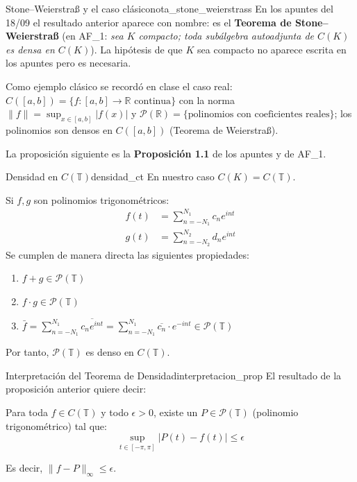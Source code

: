\begin{nota}{Stone--Weierstraß y el caso clásico}{nota_stone_weierstrass}
En los apuntes del 18/09 el resultado anterior aparece con nombre: es el \textbf{Teorema de Stone--Weierstraß} (en AF\_1: \emph{sea $K$ compacto; toda subálgebra autoadjunta de $C(K)$ es densa en $C(K)$}). La hipótesis de que $K$ sea compacto no aparece escrita en los apuntes pero es necesaria.

Como ejemplo clásico se recordó en clase el caso real: $C([a,b]) = \{f : [a,b] \to \mathbb{R} \text{ continua}\}$ con la norma $\|f\| = \sup_{x \in [a,b]} |f(x)|$ y $\mathcal{P}(\mathbb{R}) = \{\text{polinomios con coeficientes reales}\}$; los polinomios son densos en $C([a,b])$ (Teorema de Weierstraß).

La proposición siguiente es la \textbf{Proposición 1.1} de los apuntes y de AF\_1.
\end{nota}

\begin{proposicion}{Densidad en $C(\mathbb{T})$}{densidad_ct}
En nuestro caso $C(K) = C(\mathbb{T})$.

Si $f, g$ son polinomios trigonométricos:
\begin{align*}
    f(t) &= \sum_{n=-N_1}^{N_1} c_n e^{int} \\
    g(t) &= \sum_{n=-N_2}^{N_2} d_n e^{int}
\end{align*}
Se cumplen de manera directa las siguientes propiedades:
\begin{enumerate}
    \item $f + g \in \mathcal{P}(\mathbb{T})$
    \item $f \cdot g \in \mathcal{P}(\mathbb{T})$
    \item $\bar{f} = \sum_{n=-N_1}^{N_1} \overline{c_n e^{int}} = \sum_{n=-N_1}^{N_1} \overline{c_n} \cdot e^{-int} \in \mathcal{P}(\mathbb{T})$
\end{enumerate}
Por tanto, $\mathcal{P}(\mathbb{T})$ es denso en $C(\mathbb{T})$.
\end{proposicion}

\begin{nota}{Interpretación del Teorema de Densidad}{interpretacion_prop}
El resultado de la proposición anterior quiere decir:

Para toda $f \in C(\mathbb{T})$ y todo $\epsilon > 0$, existe un $P \in \mathcal{P}(\mathbb{T})$ (polinomio trigonométrico) tal que:
\begin{equation*}
    \sup_{t \in [-\pi, \pi]} |P(t) - f(t)| \le \epsilon
\end{equation*}


Es decir, $\|f - P\|_\infty \le \epsilon$.
\end{nota}


